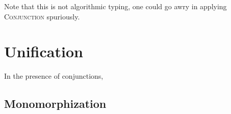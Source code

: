 \documentclass{article}
\begin{document}
Note that this is not algorithmic typing, one could go awry in applying \textsc{Conjunction} spuriously.

\section{Unification}

In the presence of conjunctions,

\subsection{Monomorphization}



\end{document}
